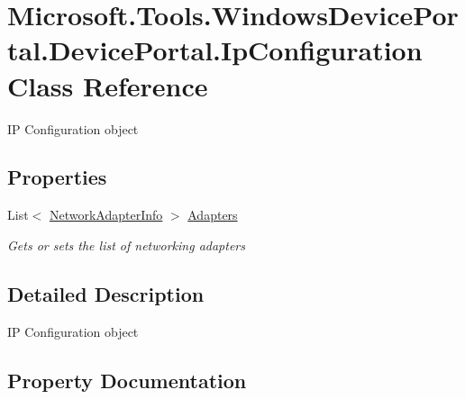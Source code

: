 \hypertarget{class_microsoft_1_1_tools_1_1_windows_device_portal_1_1_device_portal_1_1_ip_configuration}{}\section{Microsoft.\+Tools.\+Windows\+Device\+Portal.\+Device\+Portal.\+Ip\+Configuration Class Reference}
\label{class_microsoft_1_1_tools_1_1_windows_device_portal_1_1_device_portal_1_1_ip_configuration}


IP Configuration object  


\subsection*{Properties}
\begin{DoxyCompactItemize}
\item 
List$<$ \hyperlink{class_microsoft_1_1_tools_1_1_windows_device_portal_1_1_device_portal_1_1_network_adapter_info}{Network\+Adapter\+Info} $>$ \hyperlink{class_microsoft_1_1_tools_1_1_windows_device_portal_1_1_device_portal_1_1_ip_configuration_a50e7442ff38497a522dc3940b8a1ae3f}{Adapters}
\begin{DoxyCompactList}\small\item\em Gets or sets the list of networking adapters \end{DoxyCompactList}\end{DoxyCompactItemize}


\subsection{Detailed Description}
IP Configuration object 



\subsection{Property Documentation}
